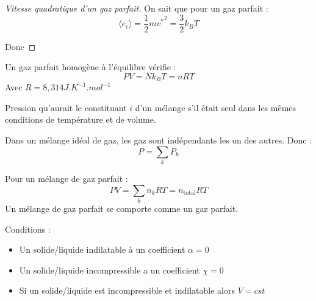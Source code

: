 \documentclass[12pt]{article}
\theoremstyle{cstyle}{\newtheorem{definition}{Définition}[section]}
\theoremstyle{cstyle}{\newtheorem{proposition}[definition]{Propriété}}
\theoremstyle{mystyle}{\newtheorem{theorem}[definition]{Théorème}}
\theoremstyle{mystyle}{\newtheorem{lemma}[definition]{Lemme}}
\theoremstyle{mystyle}{\newtheorem{corollary}[definition]{Corollaire}}
\theoremstyle{mystyle}{\newtheorem*{remark}{Remarque}}
\theoremstyle{mystyle}{\newtheorem*{remarks}{Remarques}}
\theoremstyle{mystyle}{\newtheorem*{example}{Exemple}}
\theoremstyle{mystyle}{\newtheorem*{examples}{Exemples}}
\theoremstyle{definition}{\newtheorem*{exercise}{Exercice}}
\theoremstyle{mystyle}{\newtheorem*{methode}{Méthode}}
\theoremstyle{cstyle}{\newtheorem*{cthm}{}}
\theoremstyle{warn}
\begin{document}
\newpage
\begin{minipage}[t]{0.45\textwidth}
	\begin{proof}[Vitesse quadratique d'un gaz parfait]
		On sait que pour un gaz parfait :
		\[
		\langle e_c \rangle = \frac{1}{2}m{v^*}^2 = \frac{3}{2} k_B T
		\]
		
		Donc 
	\end{proof}

	\begin{proposition}
		Un gaz parfait homogène à l'équilibre vérifie :
		\[PV = Nk_BT = nRT\]
		Avec $R = 8,314J.K^{-1}.mol^{-1}$ 
	\end{proposition}

	\begin{definition}
		Pression qu'aurait le constituant $i$ d'un mélange s'il était seul dans les mêmes conditions de température et de volume.
	\end{definition}
	\begin{proposition}
		Dans un mélange idéal de gaz, les gaz sont indépendants les un des autres. Donc :
		\[
			P = \sum_k P_k
		\]
	\end{proposition}

	\begin{proposition}
		Pour un mélange de gaz parfait :
		\[
			PV = \sum_k n_kRT = n_{\text{total}}RT
		\]
		Un mélange de gaz parfait se comporte comme un gaz parfait.
	\end{proposition}
\end{minipage}
\hfill
\vrule
\hfill
\begin{minipage}[t]{0.45\textwidth}
	\begin{proposition}
		Conditions :
		\begin{itemize}
			\item Un solide/liquide indilatable à un coefficient $\alpha = 0$
			\item Un solide/liquide incompressible a un coefficient $\chi = 0$
			\item Si un solide/liquide est incompressible et indilatable alors $V = cst$
		\end{itemize}
	\end{proposition}
\end{minipage}
\end{document}
